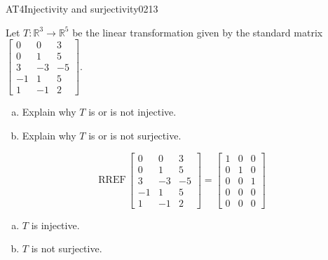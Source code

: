 \begin{exercise}{AT4}{Injectivity and surjectivity}{0213} 
\begin{exerciseStatement} 

 Let \(T:\mathbb{R}^3 \to \mathbb{R}^5\) be the linear transformation given by the standard matrix \(\left[\begin{array}{ccc}
0 & 0 & 3 \\
0 & 1 & 5 \\
3 & -3 & -5 \\
-1 & 1 & 5 \\
1 & -1 & 2
\end{array}\right]\). 

 

\begin{enumerate}[(a)]
\item 

Explain why \(T\) is or is not injective.


\item 

Explain why \(T\) is or is not surjective.


\end{enumerate}

     \end{exerciseStatement}
 \begin{exerciseAnswer} 

\[\mathrm{RREF}\,\left[\begin{array}{ccc}
0 & 0 & 3 \\
0 & 1 & 5 \\
3 & -3 & -5 \\
-1 & 1 & 5 \\
1 & -1 & 2
\end{array}\right]=\left[\begin{array}{ccc}
1 & 0 & 0 \\
0 & 1 & 0 \\
0 & 0 & 1 \\
0 & 0 & 0 \\
0 & 0 & 0
\end{array}\right]\]

 

\begin{enumerate}[(a)]
\item  

\(T\) is injective.

 
\item  

\(T\) is not surjective.

 
\end{enumerate}

     \end{exerciseAnswer}
 \end{exercise}


